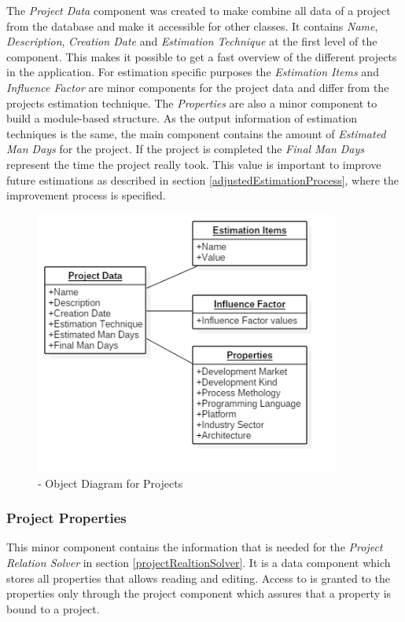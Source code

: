 The \textit{Project Data} component was created to make combine all data of a project from the database and make it accessible for other classes. It contains \textit{Name}, \textit{Description}, \textit{Creation Date} and \textit{Estimation Technique} at the first level of the component. This makes it possible to get a fast overview of the different projects in the application. For estimation specific purposes the \textit{Estimation Items} and \textit{Influence Factor} are minor components for the project data and differ from the projects estimation technique. The \textit{Properties} are also a minor component to build a module-based structure. As the output information of estimation techniques is the same, the main component contains the amount of \textit{Estimated Man Days} for the project. If the project is completed the \textit{Final Man Days} represent the time the project really took. This value is important to improve future estimations as described in section \ref{adjustedEstimationProcess}, where the improvement process is specified.
\begin{figure}[h] 
	\centering 
	\includegraphics[width=10cm]{images/ObjectDiagramProject.png} 
	\caption{- Object Diagram for Projects} 
	\label{fig:objectDiagrammProject}
\end{figure}

\subsubsection{Project Properties}

This minor component contains the information that is needed for the \textit{Project Relation Solver} in section \ref{projectRealtionSolver}. It is a data component which stores all properties that allows reading and editing. Access to is granted to the properties only through the project component which assures that a property is bound to a project.\\

